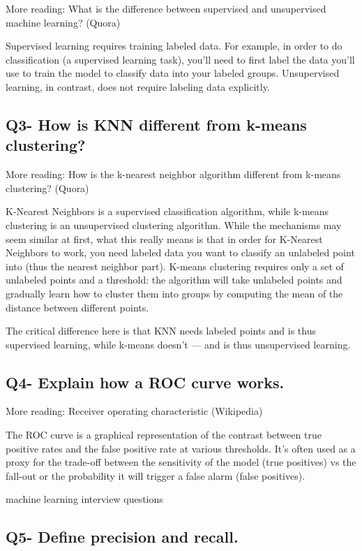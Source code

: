 \documentclass[11pt,a4paper]{article}
\begin{document}
More reading: What is the difference between supervised and unsupervised machine learning? (Quora)

Supervised learning requires training labeled data. For example, in order to do classification (a supervised learning task), you’ll need to first label the data you’ll use to train the model to classify data into your labeled groups. Unsupervised learning, in contrast, does not require labeling data explicitly.

\subsection{Q3- How is KNN different from k-means clustering?}

More reading: How is the k-nearest neighbor algorithm different from k-means clustering? (Quora)

K-Nearest Neighbors is a supervised classification algorithm, while k-means clustering is an unsupervised clustering algorithm. While the mechanisms may seem similar at first, what this really means is that in order for K-Nearest Neighbors to work, you need labeled data you want to classify an unlabeled point into (thus the nearest neighbor part). K-means clustering requires only a set of unlabeled points and a threshold: the algorithm will take unlabeled points and gradually learn how to cluster them into groups by computing the mean of the distance between different points.

The critical difference here is that KNN needs labeled points and is thus supervised learning, while k-means doesn’t — and is thus unsupervised learning.

\subsection{Q4- Explain how a ROC curve works.}

More reading: Receiver operating characteristic (Wikipedia)

The ROC curve is a graphical representation of the contrast between true positive rates and the false positive rate at various thresholds. It’s often used as a proxy for the trade-off between the sensitivity of the model (true positives) vs the fall-out or the probability it will trigger a false alarm (false positives).

machine learning interview questions

\subsection{Q5- Define precision and recall.}
\end{document}
